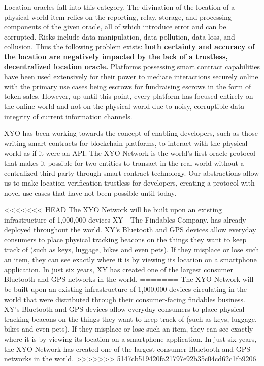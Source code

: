 \documentclass{article}
\begin{document}
Location oracles fall into this category. The divination of the location of a physical world
item relies on the reporting, relay, storage, and processing components of the given oracle,
all of which introduce error and can be corrupted. Risks include data manipulation, data
pollution, data loss, and collusion.
\clearpage
Thus the following problem exists: \textbf{both certainty and accuracy of the location are negatively impacted by the lack of a trustless, decentralized location oracle.} Platforms possessing smart contract capabilities have been used extensively for their power to mediate interactions securely online with the primary use cases being escrows for fundraising escrows in the form of token sales. However, up until this point, every platform has focused entirely on the online world and not on the physical world due to noisy, corruptible data integrity of current information channels.

XYO has been working towards the concept of enabling developers, such as those writing smart contracts for blockchain platforms, to interact with the physical world as if it were an API. The XYO Network is the world's first oracle protocol that makes it possible for two entities to transact in the real world without a centralized third party through smart contract technology. Our abstractions allow us to make location verification trustless for developers, creating a protocol with novel use cases that have not been possible until today.

<<<<<<< HEAD
The XYO Network will be built upon an existing infrastructure of 1,000,000 devices XY - The Findables Company. has already deployed throughout the world. XY's Bluetooth and GPS devices allow everyday consumers to place physical tracking beacons on the things they want to keep track of (such as keys, luggage, bikes and even pets). If they misplace or lose such an item, they can see exactly where it is by viewing its location on a smartphone application. In just six years, XY has created one of the largest consumer Bluetooth and GPS networks in the world.
=======
The XYO Network will be built upon an existing infrastructure of 1,000,000 devices circulating in the world that were distributed through their consumer-facing findables business. XY's Bluetooth and GPS devices allow everyday consumers to place physical tracking beacons on the things they want to keep track of (such as keys, luggage, bikes and even pets). If they misplace or lose such an item, they can see exactly where it is by viewing its location on a smartphone application. In just six years, the XYO Network has created one of the largest consumer Bluetooth and GPS networks in the world.
>>>>>>> 5147cb519420fa21797e92b35c04cd62c1fb9206
\end{document}
